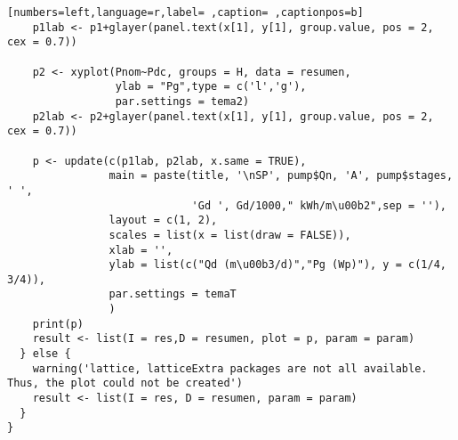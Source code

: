 \begin{lstlisting}[numbers=left,language=r,label= ,caption= ,captionpos=b]
    p1lab <- p1+glayer(panel.text(x[1], y[1], group.value, pos = 2, cex = 0.7))

    p2 <- xyplot(Pnom~Pdc, groups = H, data = resumen,
                 ylab = "Pg",type = c('l','g'), 
                 par.settings = tema2)
    p2lab <- p2+glayer(panel.text(x[1], y[1], group.value, pos = 2, cex = 0.7))

    p <- update(c(p1lab, p2lab, x.same = TRUE),
                main = paste(title, '\nSP', pump$Qn, 'A', pump$stages, ' ',
                             'Gd ', Gd/1000," kWh/m\u00b2",sep = ''),
                layout = c(1, 2),
                scales = list(x = list(draw = FALSE)),
                xlab = '',              
                ylab = list(c("Qd (m\u00b3/d)","Pg (Wp)"), y = c(1/4, 3/4)),
                par.settings = temaT
                )
    print(p)
    result <- list(I = res,D = resumen, plot = p, param = param)
  } else {
    warning('lattice, latticeExtra packages are not all available. Thus, the plot could not be created')
    result <- list(I = res, D = resumen, param = param)
  }
}
\end{lstlisting}

